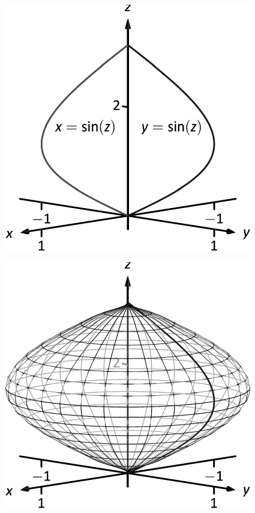 \documentclass[10pt]{article}
\begin{document}
\includegraphics{figsurfrev1a_3DBW.pdf}
\texttt{}

\includegraphics{figsurfrev1b_3DBW.pdf}
\texttt{}
\end{document}
